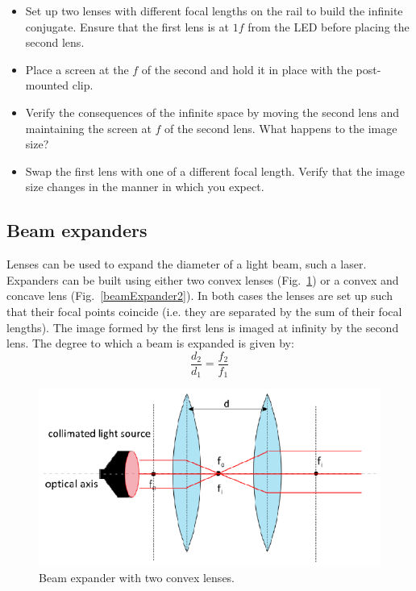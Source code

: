 \documentclass[a4paper]{report}
\begin{document}
\begin{itemize}
\item Set up two lenses with different focal lengths on the rail to build the infinite conjugate. 
Ensure that the first lens is at $1f$ from the LED before placing the second lens. 
\item Place a screen at the $f$ of the second and hold it in place with the post-mounted clip.
\item Verify the consequences of the infinite space by moving the second lens and maintaining the screen at $f$ of the second lens. 
What happens to the image size?
\item Swap the first lens with one of a different focal length. 
Verify that the image size changes in the manner in which you expect. 
\end{itemize}



\clearpage


\subsection{Beam expanders}
Lenses can be used to expand the diameter of a light beam, such a laser.
Expanders can be built using either two convex lenses (Fig.~\ref{beamExpander1}) or a convex and concave lens (Fig.~\ref{beamExpander2}). 
In both cases the lenses are set up such that their focal points coincide (i.e. they are separated by the sum of their focal lengths). 
The image formed by the first lens is imaged at infinity by the second lens.
The degree to which a beam is expanded is given by:
\begin{equation}
\frac{d_2}{d_1}=\frac{f_2}{f_1}
\label{eq:beamExp}
\end{equation}

\begin{figure}[h]
\center
\includegraphics[width=4.5in]{beamExpander1.eps}
\caption{Beam expander with two convex lenses.}
\label{beamExpander1}
\end{figure}
\end{document}
